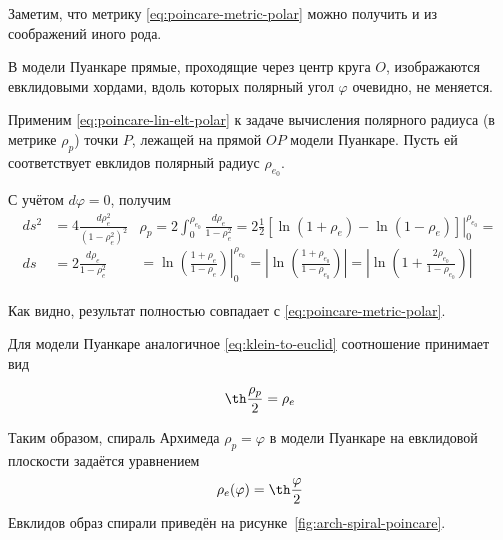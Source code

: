\documentclass{article}
\numberwithin{equation}{section}
\renewcommand{\phi}{\varphi}
\providecommand{\abs}[1]{\left \lvert{#1}\right \rvert}
\begin{document}
Заметим, что метрику \eqref{eq:poincare-metric-polar} можно
получить и из соображений иного рода.

В модели Пуанкаре прямые, проходящие через центр круга $O$,
изображаются евклидовыми хордами, вдоль которых полярный угол $\phi$
очевидно, не меняется.

Применим \eqref{eq:poincare-lin-elt-polar} к задаче вычисления
полярного радиуса (в метрике $\rho_p$) точки $P$, лежащей на прямой
$OP$ модели Пуанкаре. Пусть ей соответствует евклидов полярный радиус
$\rho_{e_0}$.

С учётом $d\phi=0$, получим
\begin{subequations}
  \begin{equation*}
    \begin{split}
      ds^2&=4\frac{d\rho_e^2}{(1-\rho_e^2)^2} \\
      ds &= 2\frac{d\rho_e}{1-\rho_e^2} \\
    \end{split}
  \end{equation*}
  \begin{multline*}
    \rho_p = 2\int_0^{\rho_{e_0}} \frac{d\rho_e}{1-\rho_e^2} =
     2 \frac{1}{2} \left . \left [ \ln(1+\rho_e) - \ln(1-\rho_e)
       \right ] \right\rvert_0^{\rho_{e_0}} = \\
     = \left . \ln{\left( \frac{1+\rho_e}{1-\rho_e} \right)} \right
     \rvert_0^{\rho_{e_0}} =
     \abs{ \ln{\left(\frac{1+\rho_{e_0}}{1-\rho_{e_0}} \right)}} =
     \abs{ \ln{\left(1+\frac{2\rho_{e_0}}{1-\rho_{e_0}} \right)}}
  \end{multline*}
\end{subequations}

Как видно, результат полностью совпадает с
\eqref{eq:poincare-metric-polar}.

Для модели Пуанкаре аналогичное \eqref{eq:klein-to-euclid} соотношение
принимает вид

\begin{equation}\label{eq:poincare-to-euclid}
  \th \frac{\rho_p}{2} = \rho_e
\end{equation}

Таким образом, спираль Архимеда $\rho_p = \phi$ в модели Пуанкаре на
евклидовой плоскости задаётся уравнением
\begin{equation}\label{eq:arch-spiral-poincare}
  \rho_e(\phi) = \th\frac{\phi}{2}
\end{equation}
Евклидов образ спирали приведён на рисунке \ref{fig:arch-spiral-poincare}.
\end{document}
